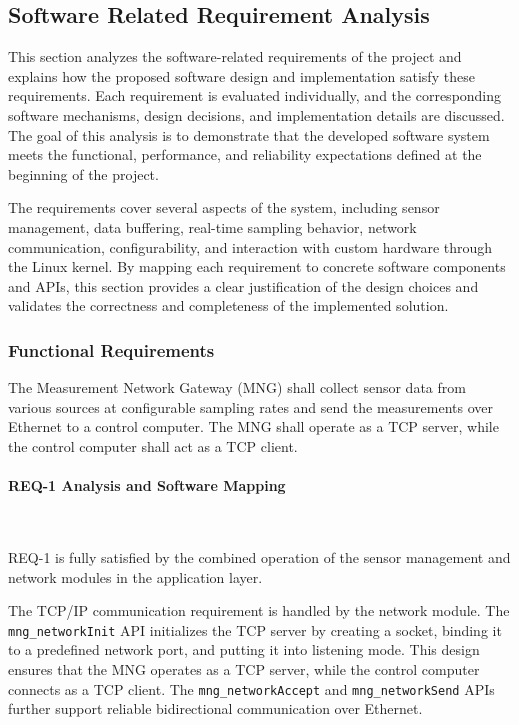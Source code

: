 \documentclass{article}
\begin{document}
\newpage
\subsection{Software Related Requirement Analysis }
This section analyzes the software-related requirements of the project and explains 
how the proposed software design and implementation satisfy these requirements. 
Each requirement is evaluated individually, and the corresponding software 
mechanisms, design decisions, and implementation details are discussed. The goal 
of this analysis is to demonstrate that the developed software system meets the 
functional, performance, and reliability expectations defined at the beginning of 
the project.

The requirements cover several aspects of the system, including sensor management, 
data buffering, real-time sampling behavior, network communication, configurability, 
and interaction with custom hardware through the Linux kernel. By mapping each 
requirement to concrete software components and APIs, this section provides a clear 
justification of the design choices and validates the correctness and completeness 
of the implemented solution.

\subsubsection{Functional Requirements}


\begin{tcolorbox}[
    title=REQ-1,
    colback=gray!5,
    colframe=black,
    fonttitle=\bfseries
]
The Measurement Network Gateway (MNG) shall collect sensor data from various
sources at configurable sampling rates and send the measurements over Ethernet
to a control computer. The MNG shall operate as a TCP server, while the control
computer shall act as a TCP client.
\end{tcolorbox}


\paragraph{REQ-1 Analysis and Software Mapping}\

REQ-1 is fully satisfied by the combined operation of the sensor management and 
network modules in the application layer.

The TCP/IP communication requirement is handled by the network module. The 
\texttt{mng\_networkInit} API initializes the TCP server by creating a socket, binding it to 
a predefined network port, and putting it into listening mode. This design ensures 
that the MNG operates as a TCP server, while the control computer connects as a TCP 
client. The \texttt{mng\_networkAccept} and \texttt{mng\_networkSend} APIs further support reliable 
bidirectional communication over Ethernet.
\end{document}
